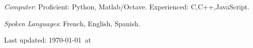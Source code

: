 \documentclass[12pt,letterpaper]{article}
\def\HCode#1{}
\renewenvironment{itemize}{
  \begin{list}{}{
    \setlength{\leftmargin}{1.5em}
    \setlength{\itemsep}{0.25em}
    \setlength{\parskip}{0pt}
    \setlength{\parsep}{0.25em}
  }
}{
  \end{list}
}
\begin{document}
\begin{itemize}
  \item \emph{Computer}: Proficient: Python, Matlab/Octave. Experienced: C,C++,JavaScript.
  \item \emph{Spoken Languages}: French, English, Spanish.
\end{itemize}




\vfill
\HCode{<center>}
\begin{center}
    \begin{small}
        Last updated: \today\ at \currenttime
    \end{small}
\end{center}
\HCode{</center>}



\HCode{</div>} %
\HCode{</div>} %
\HCode{</div>} %
\end{document}
